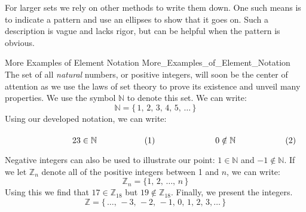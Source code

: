         For larger sets we rely on other methods to write them down. One
        such means is to indicate a pattern and use an ellipses to show that
        it goes on. Such a description is vague and lacks rigor, but can be
        helpful when the pattern is obvious.
        \begin{lexample}{More Examples of Element Notation}
                        {More_Examples_of_Element_Notation}
            The set of all \textit{natural} numbers, or positive integers,
            will soon be the center of attention as we use the laws of set
            theory to prove its existence and unveil many properties. We
            use the symbol $\mathbb{N}$ to denote this set. We can write:
            \begin{equation}
                \label{eqn:Natural_Numbers_Ellipses}%
                \mathbb{N}=\{\,1,\,2,\,3,\,4,\,5,\,\dots\,\}
            \end{equation}
            Using our developed notation, we can write:
            \par
            \begin{subequations}
                \begin{minipage}[b]{0.49\textwidth}
                    \begin{equation}
                        23\in\mathbb{N}
                    \end{equation}
                \end{minipage}
                \hfill
                \begin{minipage}[b]{0.49\textwidth}
                    \begin{equation}
                        0\notin\mathbb{N}
                    \end{equation}
                \end{minipage}
            \end{subequations}
            \par\vspace{2.5ex}
            Negative integers can also be used to illustrate our point:
            $1\in\mathbb{N}$ and $\minus{1}\notin\mathbb{N}$. If we let
            $\mathbb{Z}_{n}$ denote all of the positive integers between
            1 and $n$, we can write:
            \begin{equation}
                \mathbb{Z}_{n}=\{1,\,2,\,\dots,\,n\,\}
            \end{equation}
            Using this we find that $17\in\mathbb{Z}_{18}$ but
            $19\notin\mathbb{Z}_{18}$. Finally, we present
            the integers.
            \begin{equation}
                \label{eqn:Integers_Ellipses}%
                \mathbb{Z}=\{\,\dots,\,\minus{3},\,\minus{2},\,\minus{1},
                                \,0,\,1,\,2,\,3,\dots\,\}
            \end{equation}
        \end{lexample}
